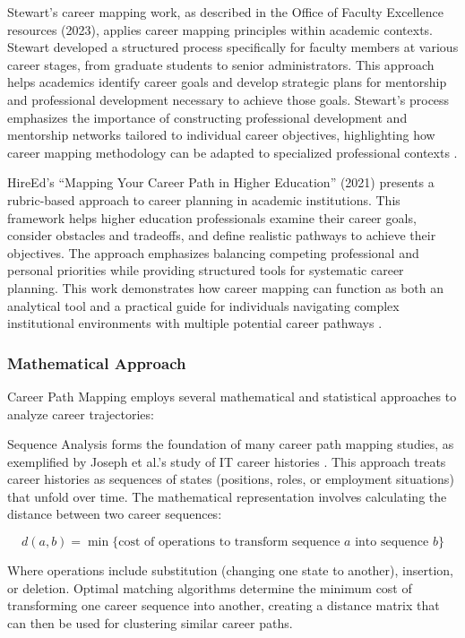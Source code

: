 \documentclass[../main.tex]{subfiles}
\begin{document}
Stewart's career mapping work, as described in the Office of Faculty Excellence resources (2023), applies career mapping principles within academic contexts. Stewart developed a structured process specifically for faculty members at various career stages, from graduate students to senior administrators. This approach helps academics identify career goals and develop strategic plans for mentorship and professional development necessary to achieve those goals. Stewart's process emphasizes the importance of constructing professional development and mentorship networks tailored to individual career objectives, highlighting how career mapping methodology can be adapted to specialized professional contexts \citep{ncsu2023}.

HireEd's ``Mapping Your Career Path in Higher Education'' (2021) presents a rubric-based approach to career planning in academic institutions. This framework helps higher education professionals examine their career goals, consider obstacles and tradeoffs, and define realistic pathways to achieve their objectives. The approach emphasizes balancing competing professional and personal priorities while providing structured tools for systematic career planning. This work demonstrates how career mapping can function as both an analytical tool and a practical guide for individuals navigating complex institutional environments with multiple potential career pathways \citep{hireed2021}.

\subsubsection{Mathematical Approach}

Career Path Mapping employs several mathematical and statistical approaches to analyze career trajectories:

Sequence Analysis forms the foundation of many career path mapping studies, as exemplified by Joseph et al.'s study of IT career histories \citep{joseph2012}. This approach treats career histories as sequences of states (positions, roles, or employment situations) that unfold over time. The mathematical representation involves calculating the distance between two career sequences:

\[ d(a, b) = \min \{\text{cost of operations to transform sequence } a \text{ into sequence } b\} \]

Where operations include substitution (changing one state to another), insertion, or deletion. Optimal matching algorithms determine the minimum cost of transforming one career sequence into another, creating a distance matrix that can then be used for clustering similar career paths.
\end{document}
